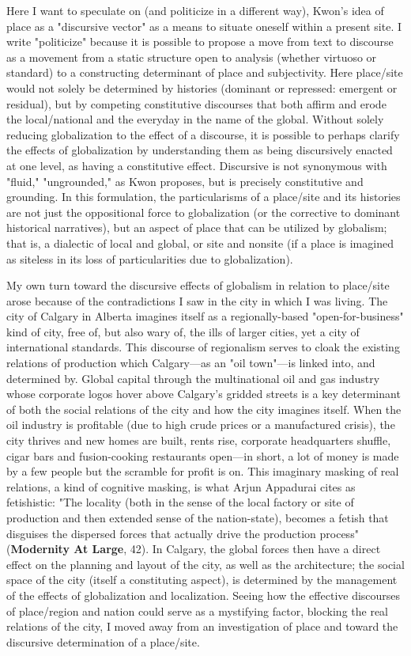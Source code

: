 Here I want to speculate on (and politicize in a different way), Kwon's
idea of place as a "discursive vector" as a means to situate oneself
within a present site. I write "politicize" because it is possible to
propose a move from text to discourse as a movement from a static
structure open to analysis (whether virtuoso or standard) to a
constructing determinant of place and subjectivity. Here place/site
would not solely be determined by histories (dominant or repressed:
emergent or residual), but by competing constitutive discourses that
both affirm and erode the local/national and the everyday in the name of
the global. Without solely reducing globalization to the effect of a
discourse, it is possible to perhaps clarify the effects of
globalization by understanding them as being discursively enacted at one
level, as having a constitutive effect. Discursive is not synonymous
with "fluid," "ungrounded," as Kwon proposes, but is precisely
constitutive and grounding. In this formulation, the particularisms of a
place/site and its histories are not just the oppositional force to
globalization (or the corrective to dominant historical narratives), but
an aspect of place that can be utilized by globalism; that is, a
dialectic of local and global, or site and nonsite (if a place is
imagined as siteless in its loss of particularities due to
globalization).

My own turn toward the discursive effects of globalism in relation to
place/site arose because of the contradictions I saw in the city in
which I was living. The city of Calgary in Alberta imagines itself as a
regionally-based "open-for-business" kind of city, free of, but also
wary of, the ills of larger cities, yet a city of international
standards. This discourse of regionalism serves to cloak the existing
relations of production which Calgary---as an "oil town"---is linked
into, and determined by. Global capital through the multinational oil
and gas industry whose corporate logos hover above Calgary's gridded
streets is a key determinant of both the social relations of the city
and how the city imagines itself. When the oil industry is profitable
(due to high crude prices or a manufactured crisis), the city thrives
and new homes are built, rents rise, corporate headquarters shuffle,
cigar bars and fusion-cooking restaurants open---in short, a lot of
money is made by a few people but the scramble for profit is on. This
imaginary masking of real relations, a kind of cognitive masking, is
what Arjun Appadurai cites as fetishistic: "The locality (both in the
sense of the local factory or site of production and then extended sense
of the nation-state), becomes a fetish that disguises the dispersed
forces that actually drive the production process" (\textbf{Modernity At
Large}, 42). In Calgary, the global forces then have a direct effect on
the planning and layout of the city, as well as the architecture; the
social space of the city (itself a constituting aspect), is determined
by the management of the effects of globalization and localization.
Seeing how the effective discourses of place/region and nation could
serve as a mystifying factor, blocking the real relations of the city, I
moved away from an investigation of place and toward the discursive
determination of a place/site.

